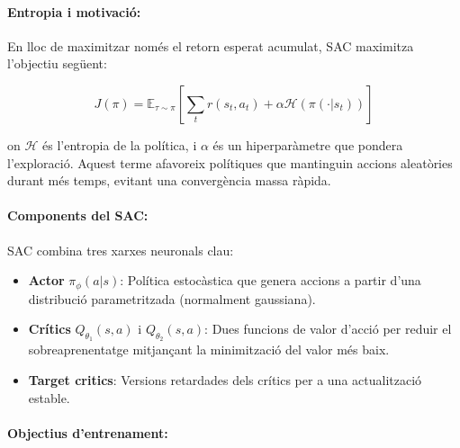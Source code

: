 \documentclass[12pt,a4paper,twoside]{book}
\begin{document}
\paragraph{Entropia i motivació:}

En lloc de maximitzar només el retorn esperat acumulat, SAC maximitza l'objectiu següent:

\begin{equation}
J(\pi) = \mathbb{E}_{\tau \sim \pi} \left[ \sum_t r(s_t, a_t) + \alpha \mathcal{H}(\pi(\cdot|s_t)) \right]
\end{equation}

on $\mathcal{H}$ és l'entropia de la política, i $\alpha$ és un hiperparàmetre que pondera l'exploració. Aquest terme afavoreix polítiques que mantinguin accions aleatòries durant més temps, evitant una convergència massa ràpida.

\paragraph{Components del SAC:}

SAC combina tres xarxes neuronals clau:

\begin{itemize}
  \item \textbf{Actor} $\pi_\phi(a|s)$: Política estocàstica que genera accions a partir d'una distribució parametritzada (normalment gaussiana).
  \item \textbf{Crítics} $Q_{\theta_1}(s,a)$ i $Q_{\theta_2}(s,a)$: Dues funcions de valor d'acció per reduir el sobreaprenentatge mitjançant la minimització del valor més baix.
  \item \textbf{Target critics}: Versions retardades dels crítics per a una actualització estable.
\end{itemize}

\paragraph{Objectius d'entrenament:}
\end{document}

